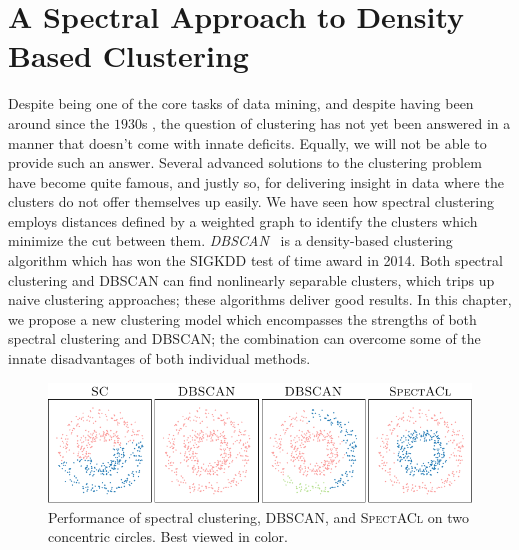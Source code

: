 \chapter{A Spectral Approach to Density Based Clustering}
\label{chap:Spectacl}
Despite being one of the core tasks of data mining, and despite having been around since the $1930$s \citep{driver1932quantitative,klimek1935culture,tryon1939cluster}, the question of clustering has not yet been answered in a
manner that doesn't come with innate deficits. Equally, we will not be able to provide such an answer. Several advanced solutions to the clustering problem have become quite famous, and justly so, for delivering insight in data where the clusters do not offer themselves up easily.  We have seen how spectral clustering employs distances defined by a weighted graph to identify the clusters which minimize the cut between them.  \emph{DBSCAN}~\citep{ester1996density} is a density-based clustering algorithm 
which has won the SIGKDD test of time award in 2014.  Both spectral clustering and DBSCAN can find 
nonlinearly separable clusters, which trips up naive clustering approaches; these algorithms deliver 
good results. In this chapter, we propose a new clustering model which encompasses the strengths of both 
spectral clustering and DBSCAN; the combination can overcome some of the innate disadvantages of both 
individual methods.
\begin{figure}[t]
\centering
\includegraphics[width=\linewidth]{pics/SAIntroCircles.pdf}
%
\caption{Performance of spectral clustering, DBSCAN, and \textsc{SpectACl} on two concentric circles. Best viewed in color.}
\label{fig:intro}
\end{figure}


